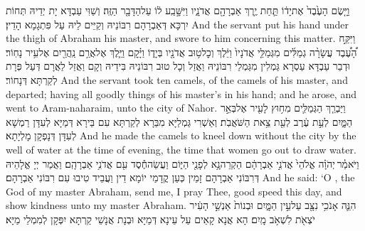 {וַיָּ֤שֶׂם הָעֶ֙בֶד֙ אֶת\maqqaf יָד֔וֹ תַּ֛חַת יֶ֥רֶךְ אַבְרָהָ֖ם אֲדֹנָ֑יו וַיִּשָּׁ֣בַֽע ל֔וֹ עַל\maqqaf הַדָּבָ֖ר הַזֶּֽה׃}
{וְשַׁוִּי עַבְדָּא יָת יְדֵיהּ תְּחוֹת יִרְכָּא דְּאַבְרָהָם רִבּוֹנֵיהּ וְקַיֵּים לֵיהּ עַל פִּתְגָמָא הָדֵין׃}
{And the servant put his hand under the thigh of Abraham his master, and swore to him concerning this matter.}{}
{וַיִּקַּ֣ח הָ֠עֶ֠בֶד עֲשָׂרָ֨ה גְמַלִּ֜ים מִגְּמַלֵּ֤י אֲדֹנָיו֙ וַיֵּ֔לֶךְ וְכׇל\maqqaf ט֥וּב אֲדֹנָ֖יו בְּיָד֑וֹ וַיָּ֗קׇם וַיֵּ֛לֶךְ אֶל\maqqaf אֲרַ֥ם נַֽהֲרַ֖יִם אֶל\maqqaf עִ֥יר נָחֽוֹר׃}
{וּדְבַר עַבְדָּא עַסְרָא גַּמְלִין מִגַּמְלֵי רִבּוֹנֵיהּ וַאֲזַל וְכָל טוּב רִבּוֹנֵיהּ בִּידֵיהּ וְקָם וַאֲזַל לַאֲרָם דְּעַל פְּרָת לְקַרְתָּא דְּנָחוֹר׃}
{And the servant took ten camels, of the camels of his master, and departed; having all goodly things of his master’s in his hand; and he arose, and went to Aram-naharaim, unto the city of Nahor.}{}
{וַיַּבְרֵ֧ךְ הַגְּמַלִּ֛ים מִח֥וּץ לָעִ֖יר אֶל\maqqaf בְּאֵ֣ר הַמָּ֑יִם לְעֵ֣ת עֶ֔רֶב לְעֵ֖ת צֵ֥את הַשֹּׁאֲבֹֽת׃}
{וְאַשְׁרִי גַּמְלַיָּא מִבַּרָא לְקַרְתָּא עִם בֵּירָא דְּמַיָּא לְעִדָּן רַמְשָׁא לְעִדָּן דְּנָפְקָן מָלְיָתָא׃}
{And he made the camels to kneel down without the city by the well of water at the time of evening, the time that women go out to draw water.}{}
{וַיֹּאמַ֓ר \legarmeh  יְהֹוָ֗ה אֱלֹהֵי֙ אֲדֹנִ֣י אַבְרָהָ֔ם הַקְרֵה\maqqaf נָ֥א לְפָנַ֖י הַיּ֑וֹם וַעֲשֵׂה\maqqaf חֶ֕סֶד עִ֖ם אֲדֹנִ֥י אַבְרָהָֽם׃}
{וַאֲמַר יְיָ אֱלָהֵיהּ דְּרִבּוֹנִי אַבְרָהָם זָמֵין כְּעַן קֳדָמַי יוֹמָא דֵין וַעֲבֵיד טִיבוּ עִם רִבּוֹנִי אַבְרָהָם׃}
{And he said: ‘O \lord, the God of my master Abraham, send me, I pray Thee, good speed this day, and show kindness unto my master Abraham.}{}
{הִנֵּ֛ה אָנֹכִ֥י נִצָּ֖ב עַל\maqqaf עֵ֣ין הַמָּ֑יִם וּבְנוֹת֙ אַנְשֵׁ֣י הָעִ֔יר יֹצְאֹ֖ת לִשְׁאֹ֥ב מָֽיִם׃}
{הָא אֲנָא קָאֵים עַל עֵינָא דְּמַיָּא וּבְנָת אֲנָשֵׁי קַרְתָּא יִפְּקָן לְמִמְלֵי מַיָּא׃}
